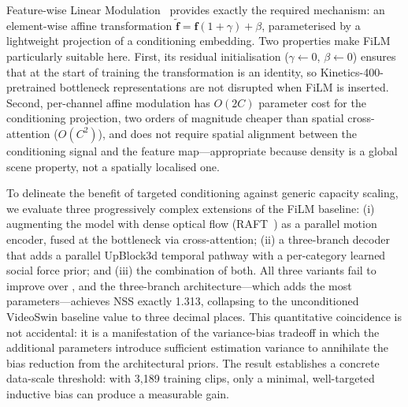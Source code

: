 \documentclass[twocolumn]{article}
\begin{document}
Feature-wise Linear Modulation~\citep{film} provides exactly the required
mechanism: an element-wise affine transformation $\tilde{\mathbf{f}} =
\mathbf{f}(1+\gamma) + \beta$, parameterised by a lightweight projection of
a conditioning embedding.  Two properties make FiLM particularly suitable
here.  First, its residual initialisation ($\gamma\!\leftarrow\!0$,
$\beta\!\leftarrow\!0$) ensures that at the start of training the
transformation is an identity, so Kinetics-400-pretrained bottleneck
representations are not disrupted when FiLM is inserted.  Second, per-channel
affine modulation has $O(2C)$ parameter cost for the conditioning projection,
two orders of magnitude cheaper than spatial cross-attention ($O(C^2)$), and
does not require spatial alignment between the conditioning signal and the
feature map---appropriate because density is a global scene property, not a
spatially localised one.

To delineate the benefit of targeted conditioning against generic capacity
scaling, we evaluate three progressively complex extensions of the FiLM
baseline: (i) augmenting the model with dense optical flow (RAFT~\citep{raft})
as a parallel motion encoder, fused at the bottleneck via cross-attention;
(ii) a three-branch decoder that adds a parallel UpBlock3d temporal pathway
with a per-category learned social force prior; and (iii) the combination of
both.  All three variants fail to improve over \ourmodel, and the
three-branch architecture---which adds the most parameters---achieves NSS
exactly 1.313, collapsing to the unconditioned VideoSwin baseline value to
three decimal places.  This quantitative coincidence is not accidental: it
is a manifestation of the variance-bias tradeoff in which the additional
parameters introduce sufficient estimation variance to annihilate the bias
reduction from the architectural priors.  The result establishes a concrete
data-scale threshold: with 3,189 training clips, only a minimal, well-targeted
inductive bias can produce a measurable gain.
\end{document}

